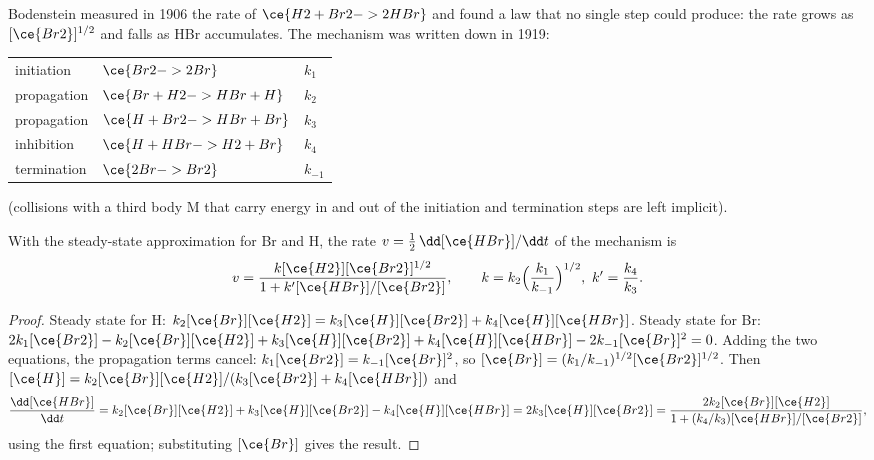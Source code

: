 Bodenstein measured in 1906 the rate of $\ce{H2 + Br2 -> 2 HBr}$ and found a law that
no single step could produce: the rate grows as $[\ce{Br2}]^{1/2}$ and falls as HBr
accumulates. The mechanism was written down in 1919:
\begin{center}
\begin{tabular}{lll}
initiation & $\ce{Br2 -> 2 Br}$ & $k_1$ \\
propagation & $\ce{Br + H2 -> HBr + H}$ & $k_2$ \\
propagation & $\ce{H + Br2 -> HBr + Br}$ & $k_3$ \\
inhibition & $\ce{H + HBr -> H2 + Br}$ & $k_4$ \\
termination & $\ce{2 Br -> Br2}$ & $k_{-1}$
\end{tabular}
\end{center}
(collisions with a third body M that carry energy in and out of the
initiation and termination steps are left implicit).

\begin{theorem}\label{thm:b3:complex-kinetics:hbr}
With the steady-state approximation for Br and H, the rate $v = \frac12\,\dd[\ce{HBr}]/\dd t$
of the mechanism is
\[
  v = \frac{k[\ce{H2}][\ce{Br2}]^{1/2}}{1 + k'[\ce{HBr}]/[\ce{Br2}]},
  \qquad k = k_2\Bigl(\frac{k_1}{k_{-1}}\Bigr)^{1/2},\ k' = \frac{k_4}{k_3}.
\]
\end{theorem}

\begin{proof}
Steady state for H: $k_2[\ce{Br}][\ce{H2}] = k_3[\ce{H}][\ce{Br2}] + k_4[\ce{H}][\ce{HBr}]$. Steady state for Br:
$2k_1[\ce{Br2}] - k_2[\ce{Br}][\ce{H2}] + k_3[\ce{H}][\ce{Br2}] + k_4[\ce{H}][\ce{HBr}] - 2k_{-1}[\ce{Br}]^2 = 0$. Adding the two
equations, the propagation terms cancel: $k_1[\ce{Br2}] = k_{-1}[\ce{Br}]^2$, so $[\ce{Br}] =
(k_1/k_{-1})^{1/2}[\ce{Br2}]^{1/2}$. Then $[\ce{H}] = k_2[\ce{Br}][\ce{H2}]/(k_3[\ce{Br2}] + k_4[\ce{HBr}])$ and
\[
  \frac{\dd[\ce{HBr}]}{\dd t} = k_2[\ce{Br}][\ce{H2}] + k_3[\ce{H}][\ce{Br2}] - k_4[\ce{H}][\ce{HBr}] = 2k_3[\ce{H}][\ce{Br2}]
  = \frac{2k_2[\ce{Br}][\ce{H2}]}{1 + (k_4/k_3)[\ce{HBr}]/[\ce{Br2}]},
\]
using the first equation; substituting $[\ce{Br}]$ gives the result.
\end{proof}

